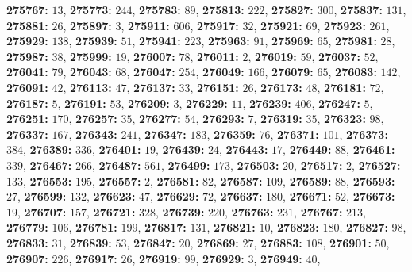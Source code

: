 \textsf{\bfseries 275767:} $13$, \textsf{\bfseries 275773:} $244$, \textsf{\bfseries 275783:} $89$, \textsf{\bfseries 275813:} $222$, \textsf{\bfseries 275827:} $300$, \textsf{\bfseries 275837:} $131$, \textsf{\bfseries 275881:} $26$, \textsf{\bfseries 275897:} $3$, \textsf{\bfseries 275911:} $606$, \textsf{\bfseries 275917:} $32$, \textsf{\bfseries 275921:} $69$, \textsf{\bfseries 275923:} $261$, \textsf{\bfseries 275929:} $138$, \textsf{\bfseries 275939:} $51$, \textsf{\bfseries 275941:} $223$, \textsf{\bfseries 275963:} $91$, \textsf{\bfseries 275969:} $65$, \textsf{\bfseries 275981:} $28$, \textsf{\bfseries 275987:} $38$, \textsf{\bfseries 275999:} $19$, \textsf{\bfseries 276007:} $78$, \textsf{\bfseries 276011:} $2$, \textsf{\bfseries 276019:} $59$, \textsf{\bfseries 276037:} $52$, \textsf{\bfseries 276041:} $79$, \textsf{\bfseries 276043:} $68$, \textsf{\bfseries 276047:} $254$, \textsf{\bfseries 276049:} $166$, \textsf{\bfseries 276079:} $65$, \textsf{\bfseries 276083:} $142$, \textsf{\bfseries 276091:} $42$, \textsf{\bfseries 276113:} $47$, \textsf{\bfseries 276137:} $33$, \textsf{\bfseries 276151:} $26$, \textsf{\bfseries 276173:} $48$, \textsf{\bfseries 276181:} $72$, \textsf{\bfseries 276187:} $5$, \textsf{\bfseries 276191:} $53$, \textsf{\bfseries 276209:} $3$, \textsf{\bfseries 276229:} $11$, \textsf{\bfseries 276239:} $406$, \textsf{\bfseries 276247:} $5$, \textsf{\bfseries 276251:} $170$, \textsf{\bfseries 276257:} $35$, \textsf{\bfseries 276277:} $54$, \textsf{\bfseries 276293:} $7$, \textsf{\bfseries 276319:} $35$, \textsf{\bfseries 276323:} $98$, \textsf{\bfseries 276337:} $167$, \textsf{\bfseries 276343:} $241$, \textsf{\bfseries 276347:} $183$, \textsf{\bfseries 276359:} $76$, \textsf{\bfseries 276371:} $101$, \textsf{\bfseries 276373:} $384$, \textsf{\bfseries 276389:} $336$, \textsf{\bfseries 276401:} $19$, \textsf{\bfseries 276439:} $24$, \textsf{\bfseries 276443:} $17$, \textsf{\bfseries 276449:} $88$, \textsf{\bfseries 276461:} $339$, \textsf{\bfseries 276467:} $266$, \textsf{\bfseries 276487:} $561$, \textsf{\bfseries 276499:} $173$, \textsf{\bfseries 276503:} $20$, \textsf{\bfseries 276517:} $2$, \textsf{\bfseries 276527:} $133$, \textsf{\bfseries 276553:} $195$, \textsf{\bfseries 276557:} $2$, \textsf{\bfseries 276581:} $82$, \textsf{\bfseries 276587:} $109$, \textsf{\bfseries 276589:} $88$, \textsf{\bfseries 276593:} $27$, \textsf{\bfseries 276599:} $132$, \textsf{\bfseries 276623:} $47$, \textsf{\bfseries 276629:} $72$, \textsf{\bfseries 276637:} $180$, \textsf{\bfseries 276671:} $52$, \textsf{\bfseries 276673:} $19$, \textsf{\bfseries 276707:} $157$, \textsf{\bfseries 276721:} $328$, \textsf{\bfseries 276739:} $220$, \textsf{\bfseries 276763:} $231$, \textsf{\bfseries 276767:} $213$, \textsf{\bfseries 276779:} $106$, \textsf{\bfseries 276781:} $199$, \textsf{\bfseries 276817:} $131$, \textsf{\bfseries 276821:} $10$, \textsf{\bfseries 276823:} $180$, \textsf{\bfseries 276827:} $98$, \textsf{\bfseries 276833:} $31$, \textsf{\bfseries 276839:} $53$, \textsf{\bfseries 276847:} $20$, \textsf{\bfseries 276869:} $27$, \textsf{\bfseries 276883:} $108$, \textsf{\bfseries 276901:} $50$, \textsf{\bfseries 276907:} $226$, \textsf{\bfseries 276917:} $26$, \textsf{\bfseries 276919:} $99$, \textsf{\bfseries 276929:} $3$, \textsf{\bfseries 276949:} $40$, 
